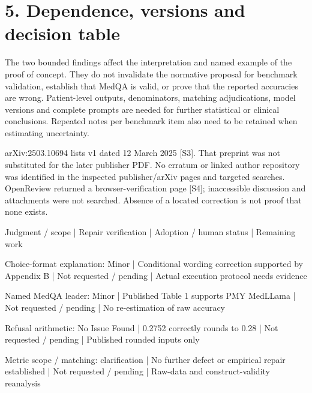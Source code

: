 \documentclass[10pt]{article}
\begin{document}
\section*{5. Dependence, versions and decision table}
The two bounded findings affect the interpretation and named example of the proof of concept. They do not invalidate the normative proposal for benchmark validation, establish that MedQA is valid, or prove that the reported accuracies are wrong. Patient-level outputs, denominators, matching adjudications, model versions and complete prompts are needed for further statistical or clinical conclusions. Repeated notes per benchmark item also need to be retained when estimating uncertainty.\par
arXiv:2503.10694 lists v1 dated 12 March 2025 [S3]. That preprint was not substituted for the later publisher PDF. No erratum or linked author repository was identified in the inspected publisher/arXiv pages and targeted searches. OpenReview returned a browser-verification page [S4]; inaccessible discussion and attachments were not searched. Absence of a located correction is not proof that none exists.\par
Judgment / scope | Repair verification | Adoption / human status | Remaining work\par
Choice-format explanation: Minor | Conditional wording correction supported by Appendix B | Not requested / pending | Actual execution protocol needs evidence\par
Named MedQA leader: Minor | Published Table 1 supports PMY MedLLama | Not requested / pending | No re-estimation of raw accuracy\par
Refusal arithmetic: No Issue Found | 0.2752 correctly rounds to 0.28 | Not requested / pending | Published rounded inputs only\par
Metric scope / matching: clarification | No further defect or empirical repair established | Not requested / pending | Raw-data and construct-validity reanalysis\par
\end{document}
